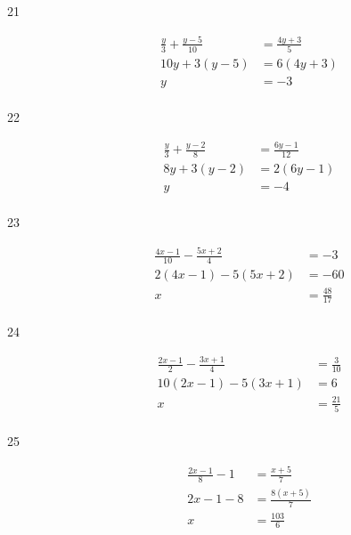 \documentclass[letterpaper, landscape]{exam}
\begin{document}
\begin{description}
      \item[21] 
        \begin{align*}
          \frac{y}{3} + \frac{y - 5}{10} & = \frac{4y + 3}{5} \\
          10y + 3(y - 5)                 & = 6 (4y + 3) \\
          y                              & = \boxed{ -3 } \\
        \end{align*}

      \item[22] 
        \begin{align*}
          \frac{y}{3} + \frac{y - 2}{8} & = \frac{6y - 1}{12} \\
          8y + 3(y - 2)                 & = 2(6y - 1) \\
          y                             & = \boxed{ -4 } \\
        \end{align*}

      \item[23] 
        \begin{align*}
          \frac{4x - 1}{10} - \frac{5x + 2}{4} & = -3 \\
          2(4x - 1) - 5(5x + 2)                & = -60 \\
          x                                    & = \boxed{ \frac{48}{17} } \\
        \end{align*}

      \item[24] 
        \begin{align*}
          \frac{2x - 1}{2} - \frac{3x + 1}{4} & = \frac{3}{10} \\
          10 (2x - 1) -  5 (3x + 1)           & = 6 \\
          x                                   & = \boxed{ \frac{21}{5} } \\
        \end{align*}

      \item[25] 
        \begin{align*}
          \frac{2x - 1}{8} - 1 & = \frac{x + 5}{7} \\
          2x - 1 - 8           & = \frac{8(x + 5)}{7} \\
          x                    & = \boxed{ \frac{103}{6} } \\
        \end{align*}


\end{description}
\end{document}
